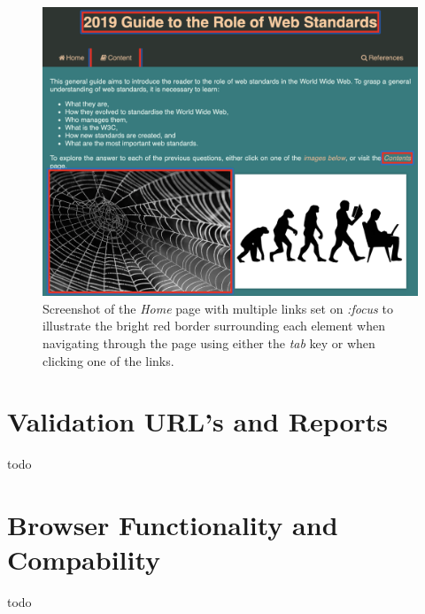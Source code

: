 \documentclass[letterpaper,12pt]{article}
\begin{document}
\begin{appendices}
\begin{figure}[h] 
\centerline{\includegraphics[width=\textwidth]{report/images/border-focus.png}}
\caption{\label{fig:border-focus}Screenshot of the \textit{Home} page with multiple links set on \textit{:focus} to illustrate the bright red border surrounding each element when navigating through the page using either the \textit{tab} key or when clicking one of the links.}
\end{figure}

\clearpage
\section{Validation URL's and Reports}
todo

\clearpage
\section{Browser Functionality and Compability}
todo

\end{appendices}
\end{document}
